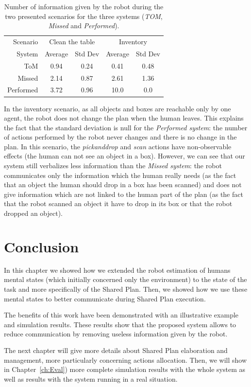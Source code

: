 \documentclass[english,a4paper,11pt,twoside]{StyleThese}
\begin{document}
\begin{table}[ht]
\begin{center}
\begin{tabular}{|r||c|c||c|c|}
\hline
 Scenario & \multicolumn{2}{c||}{Clean the table} & \multicolumn{2}{c|}{Inventory}\\
\cline{2-5} 
System & Average & Std Dev & Average & Std Dev\\
\hline
\hline
ToM & 0.94 & 0.24 & 0.41 & 0.48\\
\hline
Missed & 2.14 & 0.87 & 2.61 & 1.36\\
\hline
Performed & 3.72 & 0.96 & 10.0 & 0.0\\
\hline
\end{tabular}
\end{center}
\caption{Number of information given by the robot during the two presented scenarios for the three systems (\textit{TOM}, \textit{Missed} and \textit{Performed}).}
\label{table:results}
\end{table}

In the inventory scenario, as all objects and boxes are reachable only by one agent, the robot does not change the plan when the human leaves. This explains the fact that the standard deviation is null for the \textit{Performed system}: the number of actions performed by the robot never changes and there is no change in the plan. In this scenario, the \textit{pickanddrop} and \textit{scan} actions have non-observable effects (the human can not see an object in a box). However, we can see that our system still verbalizes less information than the \textit{Missed system}: the robot communicates only the information which the human really needs (as the fact that an object the human should drop in a box has been scanned) and does not give information which are not linked to the human part of the plan (as the fact that the robot scanned an object it have to drop in its box or that the robot dropped an object).


\section{Conclusion}

In this chapter we showed how we extended the robot estimation of humans mental states (which initially concerned only the environment) to the state of the task and more specifically of the Shared Plan. Then, we showed how we use these mental states to better communicate during Shared Plan execution.

The benefits of this work have been demonstrated with an illustrative example and simulation results. These results show that the proposed system allows to reduce communication by removing useless information given by the robot.

The next chapter will give more details about Shared Plan elaboration and management, more particularly concerning actions allocation. Then, we will show in Chapter~\ref{ch:Eval}) more complete simulation results with the whole system as well as results with the system running in a real situation.

\ifdefined{}
\else


\end{document}
